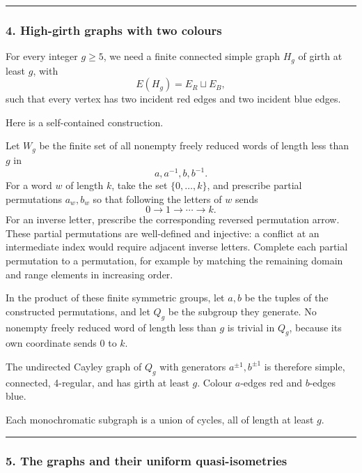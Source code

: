 \documentclass[
  11pt,
  a4paper,
]{article}
\newcounter{none} %
\begin{document}
\begin{center}\rule{0.5\linewidth}{0.5pt}\end{center}

\subsubsection{4. High-girth graphs with two
colours}\label{high-girth-graphs-with-two-colours}

For every integer \(g\ge5\), we need a finite connected simple graph
\(H_g\) of girth at least \(g\), with \[
E(H_g)=E_R\sqcup E_B,
\] such that every vertex has two incident red edges and two incident
blue edges.

Here is a self-contained construction.

Let \(W_g\) be the finite set of all nonempty freely reduced words of
length less than \(g\) in \[
a,a^{-1},b,b^{-1}.
\] For a word \(w\) of length \(k\), take the set \(\{0,\ldots,k\}\),
and prescribe partial permutations \(a_w,b_w\) so that following the
letters of \(w\) sends \[
0\to1\to\cdots\to k.
\] For an inverse letter, prescribe the corresponding reversed
permutation arrow. These partial permutations are well-defined and
injective: a conflict at an intermediate index would require adjacent
inverse letters. Complete each partial permutation to a permutation, for
example by matching the remaining domain and range elements in
increasing order.

In the product of these finite symmetric groups, let \(a,b\) be the
tuples of the constructed permutations, and let \(Q_g\) be the subgroup
they generate. No nonempty freely reduced word of length less than \(g\)
is trivial in \(Q_g\), because its own coordinate sends \(0\) to \(k\).

The undirected Cayley graph of \(Q_g\) with generators
\(a^{\pm1},b^{\pm1}\) is therefore simple, connected, 4-regular, and has
girth at least \(g\). Colour \(a\)-edges red and \(b\)-edges blue.

Each monochromatic subgraph is a union of cycles, all of length at least
\(g\).

\begin{center}\rule{0.5\linewidth}{0.5pt}\end{center}

\subsubsection{5. The graphs and their uniform
quasi-isometries}\label{the-graphs-and-their-uniform-quasi-isometries}
\end{document}
